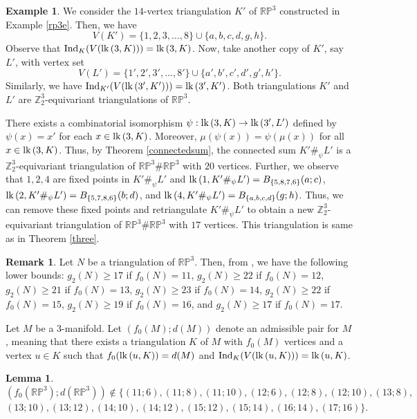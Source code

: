 \documentclass[11pt]{amsart}
\numberwithin{equation}{section}
\newtheorem{lemma}[theorem]{Lemma}
\theoremstyle{definition}
\newtheorem{example}[theorem]{Example}
\newtheorem{remark}[theorem]{Remark}
\newcommand{\lk}{\mbox{\upshape lk}\,}
\newcommand{\RP}{\mathbb{RP}}
\def \bb{\mathbb}
\def \ZZ{{\bb{Z}}}
\begin{document}
\begin{example}
We consider the $14$-vertex triangulation $K'$ of $\RP^3$ constructed in Example \ref{rp3e}. Then, we have  
$$
V(K')=\{1,2,3,\ldots,8\}\cup\{a,b,c,d,g,h\}.
$$  
Observe that $\mathrm{Ind}_K(V(\lk(3,K)))=\lk(3,K)$. Now, take another copy of $K'$, say $L'$, with vertex set  
$$
V(L')=\{1',2',3',\ldots,8'\}\cup\{a',b',c',d',g',h'\}.$$  
Similarly, we have $\mathrm{Ind}_{K'}(V(\lk(3',K')))=\lk(3',K')$. Both triangulations $K'$ and $L'$ are $\ZZ_2^3$-equivariant triangulations of $\RP^3$.  

There exists a combinatorial isomorphism $\psi:\lk(3,K)\to \lk(3',L')$ defined by $\psi(x)=x'$ for each $x\in \lk(3,K)$. Moreover, $\mu(\psi(x))=\psi(\mu(x))$ for all $x\in \lk(3,K)$. Thus, by Theorem \ref{connectedsum}, the connected sum $K'\#_{\psi}L'$ is a $\ZZ_2^3$-equivariant triangulation of $\RP^3\#\RP^3$ with $20$ vertices. Further, we observe that $1,2,4$ are fixed points in $K'\#_{\psi}L'$ and $\lk(1,K'\#_{\psi}L')=B_{\{5,8,7,6\}}(a;c)$,  $\lk(2,K'\#_{\psi}L')=B_{\{5,7,8,6\}}(b;d)$, and $\lk(4,K'\#_{\psi}L')=B_{\{a,b,c,d\}}(g;h)$. Thus, we can remove these fixed points and retriangulate $K'\#_{\psi}L'$ to obtain a new $\ZZ_2^3$-equivariant triangulation of $\RP^3\#\RP^3$ with $17$ vertices.  This triangulation is same as in  Theorem \ref{three}. 
   
\end{example}
    

\begin{remark}\label{Lutz}
  Let $N$ be a triangulation of $\mathbb{RP}^3$. Then, from \cite{LS}, we have the following lower bounds:
$g_2(N)\geq 17$ if $f_0(N)=11$,
$g_2(N)\geq 22$ if $f_0(N)=12$,
$g_2(N)\geq 21$ if $f_0(N)=13$,
$g_2(N)\geq 23$ if $f_0(N)=14$,
$g_2(N)\geq 22$ if $f_0(N)=15$,
$g_2(N)\geq 19$ if $f_0(N)=16$, and
$g_2(N)\geq 17$ if $f_0(N)=17$.
  \end{remark}

Let $M$ be a $3$-manifold. Let $(f_0(M);d(M))$ denote an admissible pair for $M$, meaning that there exists a triangulation $K$ of $M$ with $f_0(M)$ vertices and a vertex $u \in K$ such that $f_0(\lk(u,K))=d(M)$ and $\mathrm{Ind}_K(V(\lk(u,K))) = \lk(u,K)$.
\begin{lemma}\label{admissible}
    $(f_0(\RP^3);d(\RP^3))\notin \{(11;6),(11;8),(11;10), (12;6),(12;8),(12;10),(13;8),$ $(13;10),(13;12),(14;10),(14;12),(15;12),(15;14),(16;14),(17;16)\}.$
\end{lemma}
\end{document}
